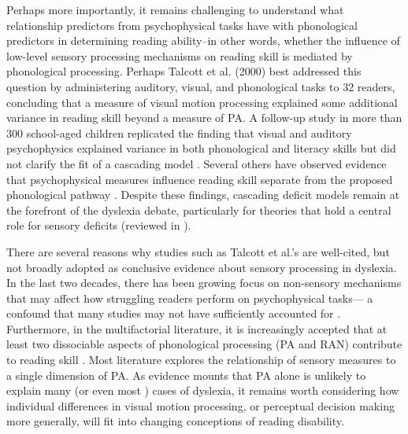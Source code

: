 \documentclass[../uwthesis.tex]{subfiles}
\begin{document}
Perhaps more importantly, it remains challenging to understand what relationship predictors from psychophysical tasks have with phonological predictors in determining reading ability--in other words, whether the influence of low-level sensory processing mechanisms on reading skill is mediated by phonological processing. Perhaps Talcott et al. (2000) best addressed this question by administering auditory, visual, and phonological tasks to 32 readers, concluding that a measure of visual motion processing explained some additional variance in reading skill beyond a measure of PA. A follow-up study in more than 300 school-aged children replicated the finding that visual and auditory psychophysics explained variance in both phonological and literacy skills but did not clarify the fit of a cascading model \cite{Talcott2000}. Several others have observed evidence that psychophysical measures influence reading skill separate from the proposed phonological pathway \cite{Snowling2019LongitudinalDyslexia,Stein2001TheDyslexia,White2006}. Despite these findings, cascading deficit models remain at the forefront of the dyslexia debate, particularly for theories that hold a central role for sensory deficits (reviewed in \cite{Goswami2015SensoryResearch}).

There are several reasons why studies such as Talcott et al.’s are well-cited, but not broadly adopted as conclusive evidence about sensory processing in dyslexia. In the last two decades, there has been growing focus on non-sensory mechanisms that may affect how struggling readers perform on psychophysical tasks— a confound that many studies may not have sufficiently accounted for 
\cite{Banai2004,Ramus2012}. Furthermore, in the multifactorial literature, it is increasingly accepted that at least two dissociable aspects of phonological processing (PA and RAN) contribute to reading skill \cite{Pennington2012IndividualModels.,Wolf1999TheDyslexias,Wolf2000Naming-speedHypothesis}. Most literature explores the relationship of sensory measures to a single dimension of PA. As evidence mounts that PA alone is unlikely to explain many (or even most \cite{Pennington2012IndividualModels.}) cases of dyslexia, it remains worth considering how individual differences in visual motion processing, or perceptual decision making more generally, will fit into changing conceptions of reading disability. 
\end{document}
